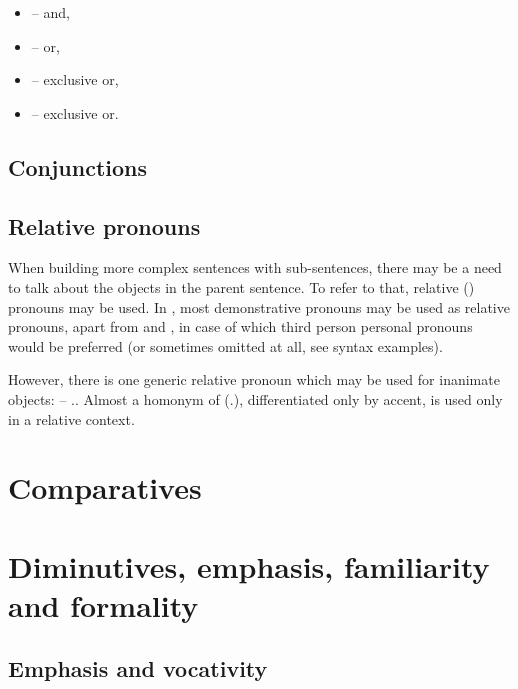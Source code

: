 \begin{itemize}
    \item {} -- and,
    \item {} -- or,
    \item {} -- exclusive or,
    \item {} -- exclusive or.
\end{itemize}

\subsection{Conjunctions}


\subsection{Relative pronouns}
When building more complex sentences with sub-sentences, there may be a need to
talk about the objects in the parent sentence. To refer to that, relative
(\Rel{}) pronouns may be used. In \andro, most demonstrative pronouns may be
used as relative pronouns, apart from  and , in case of
which third person personal pronouns would be preferred (or sometimes omitted at
all, see syntax examples).

However, there is one generic relative pronoun which may be used for inanimate
objects:  -- \Rel{}.\Inan{}. Almost a homonym of 
(\Tpl{}.\Inan{}), differentiated only by accent,  is used only in a
relative context.

\section{Comparatives}
\label{sec:comparatives}


\section{Diminutives, emphasis, familiarity and formality}
\label{sec:diminutives}

\subsection{Emphasis and vocativity}

